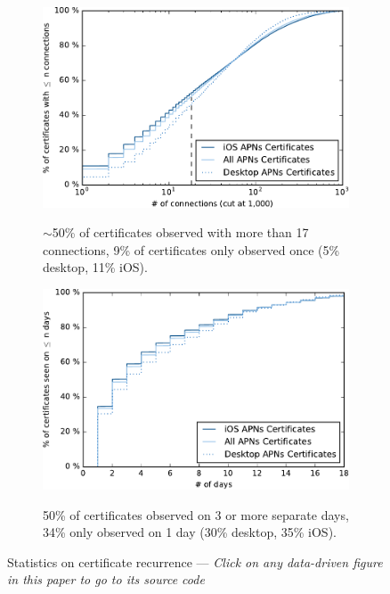 \begin{figure}%
	\centering
	\begin{subfigure}{\columnwidth}%
		\href{https://github.com/tumi8/cca-privacy/blob/master/analyses/results/1_connections_per_certificate.ipynb}{%
		\includegraphics[width=\textwidth]{figures/connspercert-crop.pdf}%
		}
		\caption{$\sim$50\% of certificates observed with more than 17 connections, 9\% of certificates only observed once (5\% desktop, 11\% iOS).}
		\label{fig:connspercert}
	\vspace{3mm} %
	\end{subfigure}
	\begin{subfigure}{\columnwidth}%
		\href{https://github.com/tumi8/cca-privacy/blob/master/analyses/results/1_connections_per_certificate_per_day.ipynb}{%
		\includegraphics[width=\textwidth]{figures/connspercert_per_day-crop.pdf}%
		}
		\caption{50\% of certificates observed on 3 or more separate days, 34\% only observed on 1 day (30\% desktop, 35\% iOS).}
		\label{fig:connspercert_per_day}
	\end{subfigure}
	\caption{Statistics on certificate recurrence --- \emph{Click on any data-driven figure in this paper to go to its source code}}
	\label{fig:connspercert_big}
	\vspace{-3mm} %
\end{figure}

